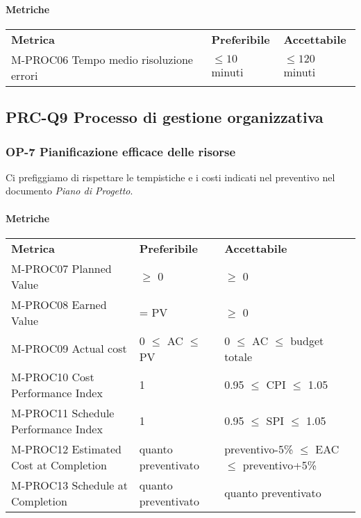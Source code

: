 			\paragraph{Metriche} \mbox{}			
			\begin{longtable} {
					>{}p{80mm} 
					>{}p{25mm}
					>{}p{25mm}
				}
				\rowcolor{gray!50}
				\textbf{Metrica} & \textbf{Preferibile} & \textbf{Accettabile} \TBstrut \TBstrut \\
				M-PROC06 Tempo medio risoluzione errori & $\le 10$ minuti & $\le 120$ minuti \TBstrut \\ [2mm]
			\end{longtable}					

	\subsection{PRC-Q9 Processo di gestione organizzativa}
		\subsubsection{OP-7 Pianificazione efficace delle risorse}
			Ci prefiggiamo di rispettare le tempistiche e i costi indicati nel preventivo nel documento \textit{Piano di Progetto}.
			\paragraph{Metriche} \mbox{} 
			\begin{longtable} {
					>{}p{60mm} 
					>{}p{35mm}
					>{}p{50mm}
				}
				\rowcolor{gray!50}
				\textbf{Metrica} & \textbf{Preferibile} & \textbf{Accettabile} \TBstrut \TBstrut \\
				M-PROC07 Planned Value & $\ge$ 0 & $\ge$ 0 \TBstrut \\ [2mm]
				M-PROC08 Earned Value & = PV & $\ge$ 0 \TBstrut \\ [2mm]
				M-PROC09 Actual cost & 0 $\le$ AC $\le$ PV &0 $\le$ AC $\le$ budget totale \TBstrut \\ [2mm]				
				M-PROC10 Cost Performance Index & 1 & 0.95 $\le$ CPI $\le$ 1.05 \TBstrut \\ [2mm]				
				M-PROC11 Schedule Performance Index & 1 & 0.95 $\le$ SPI $\le$ 1.05 \TBstrut \\ [2mm]				
				M-PROC12 Estimated Cost at Completion & quanto preventivato & preventivo-5\% $\le$ EAC $\le$ preventivo+5\% \TBstrut \\ [2mm]
				M-PROC13 Schedule at Completion & quanto preventivato & quanto preventivato \TBstrut \\ [2mm]				
			\end{longtable}

